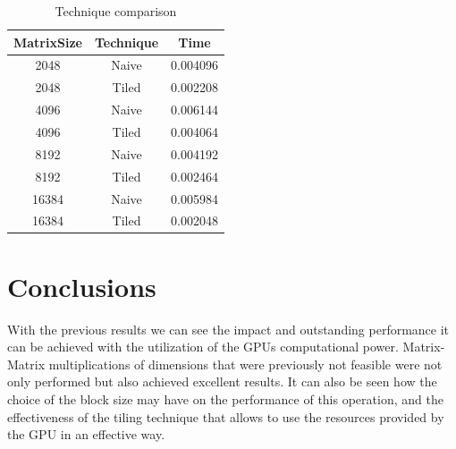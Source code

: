 \documentclass[12p,english]{article}
\begin{document}
\begin{table}
    \centering
    \begin{tabular}{|c|cc|}
    \hline
        \textbf{MatrixSize} & \textbf{Technique} & \textbf{Time} \\ \hline
        2048 & Naive & 0.004096 \\ 
        2048 & Tiled & 0.002208 \\ 
        4096 & Naive & 0.006144 \\ 
        4096 & Tiled & 0.004064 \\ 
        8192 & Naive & 0.004192 \\ 
        8192 & Tiled & 0.002464 \\ 
        16384 & Naive & 0.005984 \\ 
        16384 & Tiled & 0.002048 \\ \hline
    \end{tabular}
    \caption{Technique comparison}
\end{table}

\newpage

\section{Conclusions}

With the previous results we can see the impact and outstanding performance it can be achieved with the utilization of the GPUs computational power. Matrix-Matrix multiplications of dimensions that were previously not feasible were not only performed but also achieved excellent results. It can also be seen how the choice of the block size may have on the performance of this operation, and the effectiveness of the tiling technique that allows to use the resources provided by the GPU in an effective way. 
\end{document}

